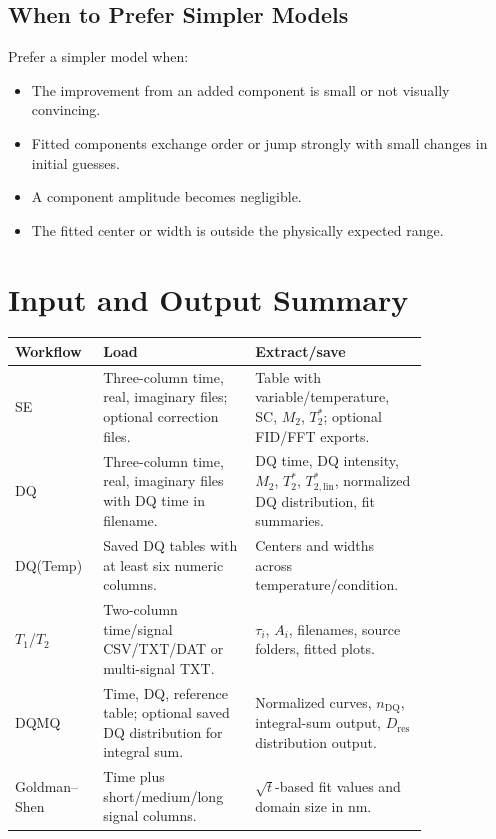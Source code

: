 \documentclass[11pt,a4paper]{article}
\newcommand{\TtwoStar}{\ensuremath{T_2^{\ast}}}
\newcommand{\Mtwo}{\ensuremath{M_2}}
\newcommand{\Dres}{\ensuremath{D_{\mathrm{res}}}}
\newcommand{\nDQ}{\ensuremath{n_{\mathrm{DQ}}}}
\newcommand{\Tone}{\ensuremath{T_1}}
\newcommand{\Ttwo}{\ensuremath{T_2}}
\newcommand{\TtwoStarLin}{\ensuremath{T_{2,\mathrm{lin}}^{\ast}}}
\begin{document}
\subsection{When to Prefer Simpler Models}
Prefer a simpler model when:
\begin{itemize}
  \item The improvement from an added component is small or not visually convincing.
  \item Fitted components exchange order or jump strongly with small changes in initial guesses.
  \item A component amplitude becomes negligible.
  \item The fitted center or width is outside the physically expected range.
\end{itemize}

\section{Input and Output Summary}

\begin{longtable}{p{0.15\linewidth}p{0.33\linewidth}p{0.34\linewidth}}
\toprule
Workflow & Load & Extract/save \\
\midrule
SE & Three-column time, real, imaginary files; optional correction files. & Table with variable/temperature, SC, \Mtwo{}, \TtwoStar{}; optional FID/FFT exports. \\
DQ & Three-column time, real, imaginary files with DQ time in filename. & DQ time, DQ intensity, \Mtwo{}, \TtwoStar{}, \TtwoStarLin{}, normalized DQ distribution, fit summaries. \\
DQ(Temp) & Saved DQ tables with at least six numeric columns. & Centers and widths across temperature/condition. \\
\Tone{}/\Ttwo{} & Two-column time/signal CSV/TXT/DAT or multi-signal TXT. & \(\tau_i\), \(A_i\), filenames, source folders, fitted plots. \\
DQMQ & Time, DQ, reference table; optional saved DQ distribution for integral sum. & Normalized curves, \nDQ{}, integral-sum output, \Dres{} distribution output. \\
Goldman--Shen & Time plus short/medium/long signal columns. & \(\sqrt{t}\)-based fit values and domain size in nm. \\
\bottomrule
\end{longtable}
\end{document}

